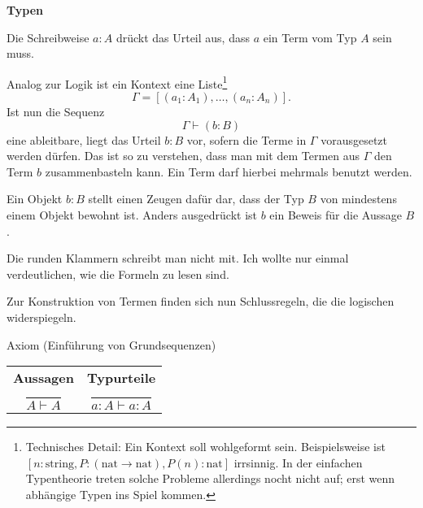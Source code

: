 \documentclass[8pt]{beamer}
\newcommand{\strong}[1]{\textsf{\textbf{#1}}}
\newcommand{\parspace}{\vspace{0.8em}}
\begin{document}
\begin{frame}[t]
\strong{Typen}

\vspace{3em}
Die Schreibweise $a\colon A$ drückt das Urteil aus, dass $a$ ein Term
vom Typ $A$ sein muss.\pause

\parspace
Analog zur Logik ist ein Kontext eine Liste\footnote{Technisches Detail:
Ein Kontext soll wohlgeformt sein.
Beispielsweise ist
$[n\colon\mathrm{string}, P\colon (\mathrm{nat}\to\mathrm{nat}), P(n)\colon\mathrm{nat}]$
irrsinnig. In der einfachen Typentheorie treten solche Probleme allerdings
nocht nicht auf; erst wenn abhängige Typen ins Spiel kommen.}
\[\Gamma = [(a_1\colon A_1),\ldots,(a_n\colon A_n)].\]
Ist nun die Sequenz
\[\Gamma\vdash (b\colon B)\]
eine ableitbare, liegt das Urteil $b\colon B$ vor, sofern die Terme
in $\Gamma$ vorausgesetzt werden dürfen. Das ist so zu verstehen,
dass man mit dem Termen aus $\Gamma$ den Term $b$ zusammenbasteln kann.
Ein Term darf hierbei mehrmals benutzt werden.

\parspace
Ein Objekt $b\colon B$ stellt einen Zeugen dafür dar, dass der Typ
$B$ von mindestens einem Objekt bewohnt ist. Anders ausgedrückt ist
$b$ ein Beweis für die Aussage $B$.

\parspace
\begin{small}
Die runden Klammern schreibt man nicht mit. Ich wollte nur einmal
verdeutlichen, wie die Formeln zu lesen sind.
\end{small}
\end{frame}

\begin{frame}
Zur Konstruktion von Termen finden sich nun Schlussregeln, die die
logischen widerspiegeln.\pause

\begin{block}{Axiom (Einführung von Grundsequenzen)}
\begin{center}
\begin{tabular}{c@{\qquad\qquad}c}
\strong{Aussagen} & \strong{Typurteile}\\[10pt]
$\dfrac{}{A\vdash A}$ & $\dfrac{}{a\colon A\vdash a\colon A}$
\end{tabular}
\end{center}
\end{block}
\end{frame}
\end{document}
